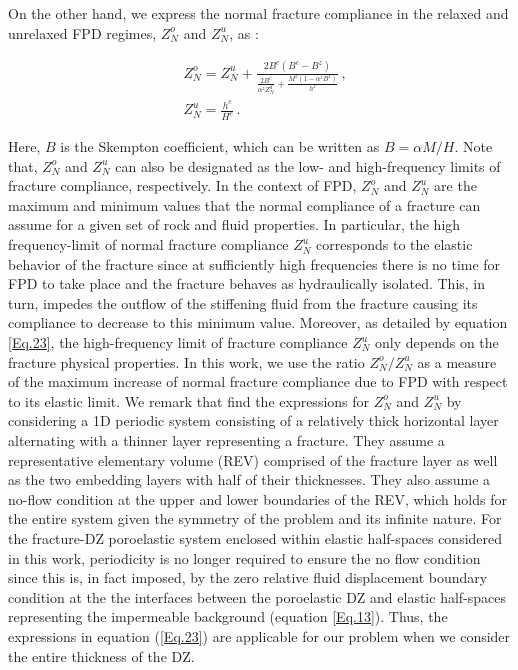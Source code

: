 \documentclass[draft]{agujournal2019}
\begin{document}
On the other hand, we express the normal fracture compliance in the relaxed and unrelaxed FPD regimes, $Z_N^o$ and $Z_N^u$, as \cite{Rubino2015a}:
\begin{linenomath*}
\begin{equation} \label{Eq.23}
\begin{split}
 & Z_N^o= Z_N^u + \frac{2 B^{c} \left(B^c-B^z \right)}{ \frac{2 B^c}{\alpha^z Z_N^d} + \frac{M^z(1-\alpha^z B^{z})}{h^z} }\,,\\
 & Z_N^u= \frac{h^{c}}{H^{c}}\,.
\end{split}
\end{equation}
\end{linenomath*}

Here, $B$ is the Skempton coefficient, which can be written as $B=\alpha M/H$. 
Note that, $Z_N^o$ and $Z_N^u$ can also be designated as the low- and high-frequency limits of fracture compliance, respectively. In the context of FPD,
$Z_N^o$ and $Z_N^u$ are the maximum and minimum values that the normal compliance of a fracture can assume for a given set of rock and fluid properties. In particular, the high frequency-limit of normal fracture compliance $Z_N^u$ corresponds to the elastic behavior of the fracture since at sufficiently high frequencies there is no time for FPD to take place and the fracture behaves as hydraulically isolated. This, in turn, impedes the outflow of the stiffening fluid from the fracture causing its compliance to decrease to this minimum value.
Moreover, as detailed by equation \ref{Eq.23}, the high-frequency limit of fracture compliance  $Z_N^u$ only depends on the fracture physical properties.
In this work, we use the ratio $Z_N^o/Z_N^u$ as a measure of the maximum increase of normal fracture compliance due to FPD with respect to its elastic limit. We remark that
 find the expressions for $Z_N^o$ and $Z_N^u$ by considering a 1D periodic system consisting of a relatively thick horizontal layer alternating with a thinner layer representing a fracture. They assume a representative elementary volume (REV) comprised of the fracture layer as well as the two embedding layers with half of their thicknesses. 
They also assume a no-flow condition at the  upper and lower boundaries of the REV, which holds for the entire system given the symmetry of the problem and its infinite nature. For  the fracture-DZ poroelastic system enclosed within elastic half-spaces considered in this work, periodicity is no longer required to ensure the no flow condition since this is, in fact imposed, by the zero relative fluid displacement boundary condition at the the interfaces between the poroelastic DZ and elastic half-spaces representing the impermeable background (equation \ref{Eq.13}). Thus, the expressions in equation (\ref{Eq.23}) are applicable for our problem when we consider the entire thickness of the DZ.
\end{document}
